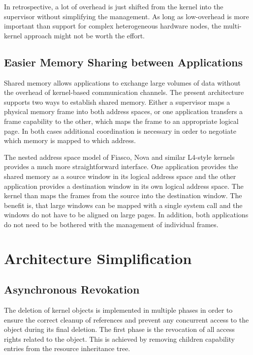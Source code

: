 In retrospective, a lot of overhead is just shifted from the kernel into the supervisor without simplifying the management. As long as low-overhead is more important than support for complex heterogeneous hardware nodes, the multi-kernel approach might not be worth the effort.

\subsection{Easier Memory Sharing between Applications}
Shared memory allows applications to exchange large volumes of data without the overhead of kernel-based communication channels. The present architecture supports two ways to establish shared memory. Either a supervisor maps a physical memory frame into both address spaces, or one application transfers a frame capability to the other, which maps the frame to an appropriate logical page. In both cases additional coordination is necessary in order to negotiate which memory is mapped to which address.   

The nested address space model of Fiasco, Nova and similar L4-style kernels provides a much more straightforward interface. One application provides the shared memory as a source window in its logical address space and the other application provides a destination window in its own logical address space. The kernel than maps the frames from the source into the destination window. The benefit is, that large windows can be mapped with a single system call and the windows do not have to be aligned on large pages. In addition, both applications do not need to be bothered with the management of individual frames. 

\section{Architecture Simplification}
\label{sec:simplification}

\subsection{Asynchronous Revokation}
The deletion of kernel objects is implemented in multiple phases in order to ensure the correct cleanup of references and prevent any concurrent access to the object during its final deletion. The first phase is the revocation of all access rights related to the object. This is achieved by removing children capability entries from the resource inheritance tree. 

